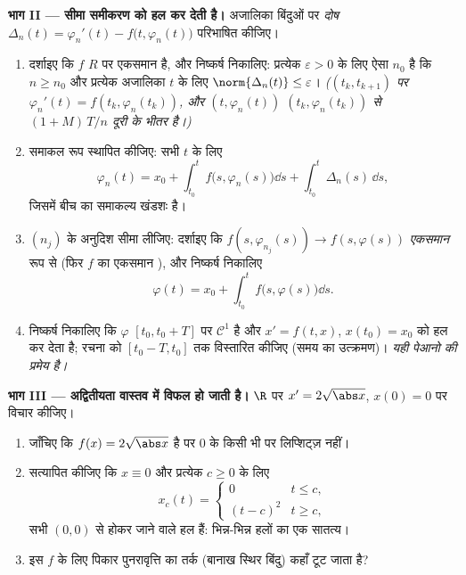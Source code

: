 \begin{problem}[{सप्ताहांत समस्या --- लिप्शिट्ज़ के बिना $x' = f(t, x)$ के
हलों का अस्तित्व}]
\medskip
\noindent\textbf{भाग II --- सीमा समीकरण को हल कर देती है।}
अजालिका बिंदुओं पर \emph{दोष} $\Delta_n(t) = \varphi_n'(t) -
f\bigl(t, \varphi_n(t)\bigr)$ परिभाषित कीजिए।
\begin{enumerate}[resume]
  \item दर्शाइए कि $f$ $R$ पर एकसमान  है, और निष्कर्ष
        निकालिए: प्रत्येक $\varepsilon > 0$ के लिए ऐसा $n_0$ है कि $n \geq n_0$ और
        प्रत्येक अजालिका $t$ के लिए $\norm{\Delta_n(t)} \leq \varepsilon$। \emph{($(t_k,
        t_{k+1})$ पर
        $\varphi_n'(t) = f(t_k, \varphi_n(t_k))$, और $(t, \varphi_n(t))$ $(t_k, \varphi_n(t_k))$ से $(1 + M)\,T/n$ दूरी के भीतर है।)}
  \item समाकल रूप स्थापित कीजिए: सभी $t$ के लिए
        \[
        \varphi_n(t) = x_0 + \int_{t_0}^{t}
        f\bigl(s, \varphi_n(s)\bigr)\dd s +
        \int_{t_0}^t \Delta_n(s)\,\dd s,
        \]
        जिसमें बीच का समाकल्य खंडशः  है।
  \item $(n_j)$ के अनुदिश सीमा लीजिए: दर्शाइए कि
        $f(s, \varphi_{n_j}(s)) \to f(s, \varphi(s))$
        \emph{एकसमान} रूप से (फिर $f$ का एकसमान ), और
        निष्कर्ष निकालिए
        \[
        \varphi(t) = x_0 + \int_{t_0}^t
        f\bigl(s, \varphi(s)\bigr)\dd s .
        \]
  \item निष्कर्ष निकालिए कि $\varphi$ $[t_0, t_0 +
        T]$ पर $\mathcal C^1$ है और $x' = f(t, x)$,
        $x(t_0) = x_0$ को हल कर देता है; रचना को $[t_0 - T, t_0]$ तक विस्तारित कीजिए
        (समय का उत्क्रमण)। \emph{यही पेआनो की प्रमेय है।}
\end{enumerate}

\medskip
\noindent\textbf{भाग III --- अद्वितीयता वास्तव में विफल हो जाती
है।} $\R$ पर $x' = 2\sqrt{\abs x}$, $x(0) = 0$ पर विचार कीजिए।
\begin{enumerate}[resume]
  \item जाँचिए कि $f(x) = 2\sqrt{\abs x}$  है पर $0$ के किसी भी  पर
        लिप्शिट्ज़ नहीं।
  \item सत्यापित कीजिए कि $x \equiv 0$ और प्रत्येक $c \geq 0$ के लिए
        \[
        x_c(t) = \begin{cases} 0 & t \leq c,\\ (t - c)^2 & t
        \geq c,\end{cases}
        \]
        सभी $(0,0)$ से होकर जाने वाले हल हैं: भिन्न-भिन्न हलों का
        एक सातत्य।
  \item इस $f$ के लिए पिकार पुनरावृत्ति का तर्क (बानाख स्थिर
        बिंदु) कहाँ टूट जाता है?
\end{enumerate}


\end{problem}
